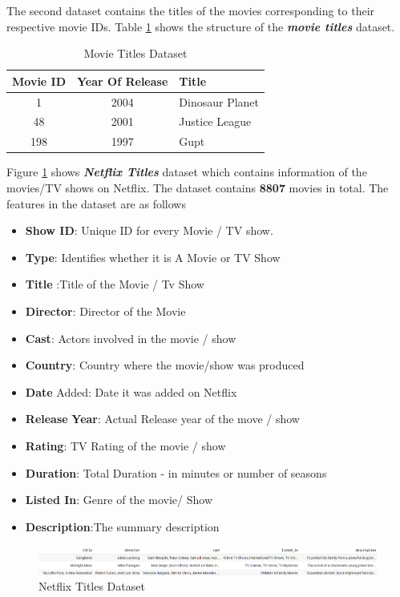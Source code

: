 \documentclass[a4paper,10pt]{article}
\begin{document}
The second dataset contains the titles of the movies corresponding to their respective movie IDs. Table \ref{Movie_titles} shows the structure of the \textit{\textbf{movie titles}} dataset. 

\begin{table}[H]
    \centering
    \begin{tabular}{|c|c|l|} \hline 
         Movie ID& Year Of Release&Title\\ \hline 
         1& 2004&Dinosaur Planet\\ \hline 
         48&  2001&Justice League\\ \hline 
         198
&  1997&Gupt\\ \hline
    \end{tabular}
    \caption{Movie Titles Dataset}
    \label{Movie_titles}
\end{table}

\vspace{10pt}
Figure \ref{netflix titles} shows \textbf{\textit{Netflix Titles}} dataset which contains information of the movies/TV shows on Netflix. The dataset contains \textbf{8807} movies in total. The features in the dataset are as follows 
\begin{itemize}
    \item \textbf{Show ID}: Unique ID for every Movie / TV show. 
    \item \textbf{Type}: Identifies whether it is A Movie or TV Show 
    \item \textbf{Title} :Title of the Movie / Tv Show 
    \item \textbf{Director}: Director of the Movie
    \item \textbf{Cast}: Actors involved in the movie / show
    \item \textbf{Country}: Country where the movie/show was produced
    \item \textbf{Date} Added: Date it was added on Netflix
    \item \textbf{Release} \textbf{Year}: Actual Release year of the move / show
    \item \textbf{Rating}: TV Rating of the movie / show
    \item \textbf{Duration}: Total Duration - in minutes or number of seasons
    \item \textbf{Listed In}: Genre of the movie/ Show
    \item \textbf{Description}:The summary description 
\end{itemize}
\begin{figure}[H]
    \centering
    \includegraphics[width=1\linewidth]{figures/netflix_title.png}
    \caption{Netflix Titles Dataset}
    \label{netflix titles}
\end{figure}
\end{document}
